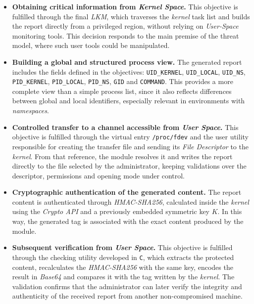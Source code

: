 \begin{itemize}
    \item \textbf{Obtaining critical information from \textit{Kernel Space}.} This objective is fulfilled through the final \textit{LKM}, which traverses the \textit{kernel} task list and builds the report directly from a privileged region, without relying on \textit{User-Space} monitoring tools. This decision responds to the main premise of the threat model, where such user tools could be manipulated.
    
    \item \textbf{Building a global and structured process view.} The generated report includes the fields defined in the objectives: \texttt{UID\_KERNEL}, \texttt{UID\_LOCAL}, \texttt{UID\_NS}, \texttt{PID\_KERNEL}, \texttt{PID\_LOCAL}, \texttt{PID\_NS}, \texttt{GID} and \texttt{COMMAND}. This provides a more complete view than a simple process list, since it also reflects differences between global and local identifiers, especially relevant in environments with \textit{namespaces}.
    
    \item \textbf{Controlled transfer to a channel accessible from \textit{User Space}.} This objective is fulfilled through the virtual entry \texttt{/proc/fdev} and the user utility responsible for creating the transfer file and sending its \textit{File Descriptor} to the \textit{kernel}. From that reference, the module resolves it and writes the report directly to the file selected by the administrator, keeping validations over the descriptor, permissions and opening mode under control.
    
    \item \textbf{Cryptographic authentication of the generated content.} The report content is authenticated through \textit{HMAC-SHA256}, calculated inside the \textit{kernel} using the \textit{Crypto API} and a previously embedded symmetric key \(K\). In this way, the generated tag is associated with the exact content produced by the module.
    
    \item \textbf{Subsequent verification from \textit{User Space}.} This objective is fulfilled through the checking utility developed in \texttt{C}, which extracts the protected content, recalculates the \textit{HMAC-SHA256} with the same key, encodes the result in \textit{Base64} and compares it with the tag written by the \textit{kernel}. The validation confirms that the administrator can later verify the integrity and authenticity of the received report from another non-compromised machine.
    

\end{itemize}
